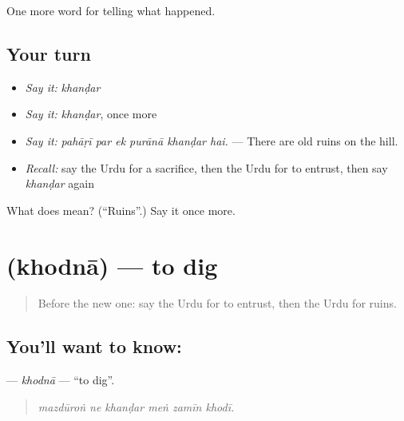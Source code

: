 \begin{grammarlens}[title={What you've built}]
One more word for telling what happened.
\end{grammarlens}

\subsection*{Your turn}
\begin{itemize}
\raggedright
  \item \emph{Say it:} \emph{khanḍar}
  \item \emph{Say it:} \emph{khanḍar}, once more
  \item \emph{Say it:} \emph{pahāṛī par ek purānā khanḍar hai.} — There are old ruins on the hill.
  \item \emph{Recall:} say the Urdu for a sacrifice, then the Urdu for to entrust, then say \emph{khanḍar} again
\end{itemize}

\begin{tcolorbox}[breakable,colback=teal!4,colframe=teal!35!black,title={Before you move on}]
What does  mean? (\textquotedblleft{}Ruins\textquotedblright{}.) Say it once more.
\end{tcolorbox}
\section[\texorpdfstring{\ur{کھودنا} (khodnā)}{کھودنا (khodnā)}]{ (khodnā) — to dig}

\label{lesson:UR-C314-khodna}



\begin{quote}
Before the new one: say the Urdu for to entrust, then the Urdu for ruins.
\end{quote}

\subsection*{You'll want to know: }
\textbf{} — \emph{khodnā} — \textquotedblleft{}to dig\textquotedblright{}.

\begin{quote}
     
\end{quote}

\begin{quote}
\emph{mazdūroṅ ne khanḍar meṅ zamīn khodī.}
\end{quote}

